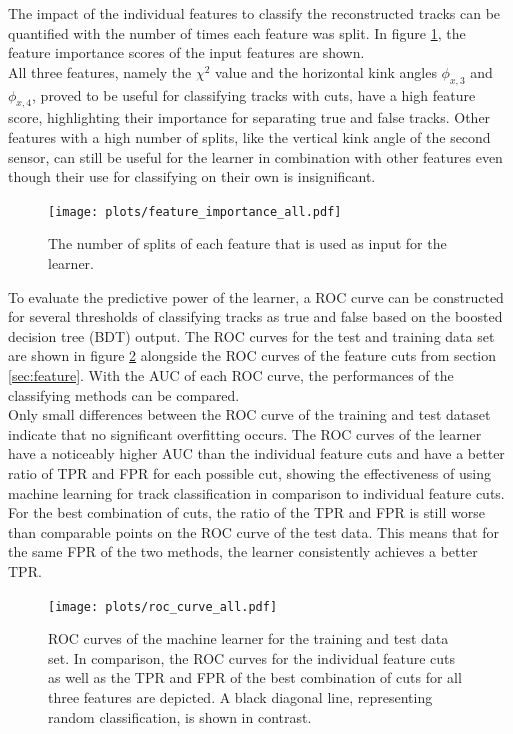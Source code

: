 The impact of the individual features to classify the reconstructed tracks can be quantified with the number of times each feature was split.
In figure \ref{fig:importance}, the feature importance scores of the input features are shown. \\
All three features, namely the $\chi^2$ value and the horizontal kink angles  $\phi_{x,3}$ and $\phi_{x,4}$,
proved to be useful for classifying tracks with cuts, have a high feature score, highlighting their importance for separating true and false tracks.
Other features with a high number of splits, like the vertical kink angle of the second sensor,
can still be useful for the learner in combination with other features even though their use for classifying on their own is insignificant.
\begin{figure}
  \centering
  \texttt{[image: plots/feature\_importance\_all.pdf]}
  \caption{The number of splits of each feature that is used as input for the learner.}
  \label{fig:importance}
\end{figure}

To evaluate the predictive power of the learner, a ROC curve can be constructed for several thresholds of classifying tracks as true and false based on the
boosted decision tree (BDT) output.
The ROC curves for the test and training data set are shown in figure \ref{fig:auc_comparison} alongside
the ROC curves of the feature cuts from section \ref{sec:feature}.
With the AUC of each ROC curve, the performances of the classifying methods can be compared. \\%
Only small differences between the ROC curve of the training and test dataset indicate that no significant overfitting occurs.
The ROC curves of the learner have a noticeably higher AUC than the individual feature cuts and have a better ratio of
TPR and FPR for each possible cut, showing the effectiveness
of using machine learning for track classification in comparison to individual feature cuts. For the best combination of cuts, the ratio of the TPR and FPR is still worse than
comparable points on the ROC curve of the test data. This means that for the same FPR of the two methods, the learner consistently achieves a better TPR.

\begin{figure}[H]
  \centering
  \texttt{[image: plots/roc\_curve\_all.pdf]}
    \caption{ROC curves of the machine learner for the training and test data set. In comparison, the ROC curves for the individual feature cuts as well as the
    TPR and FPR of the best combination of cuts for all three features are depicted. A black diagonal line, representing random classification, is shown
    in contrast.}
  \label{fig:auc_comparison}
\end{figure}

